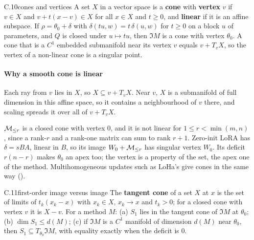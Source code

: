 
\begin{bgentry}{C.10}{cones and vertices}
A set $X$ in a vector space is a \textbf{cone} with \textbf{vertex} $v$ if $v\in X$ and $v+t(x-v)\in X$ for all $x\in X$
and $t\ge0$, and \textbf{linear} if it is an affine subspace. If $\rho=\theta_0+\delta$ with
$\delta(tu,w)=t\,\delta(u,w)$ for $t\ge0$ on a block $u$ of parameters, and $Q$ is closed under $u\mapsto tu$, then $\Im
M$ is a cone with vertex $\theta_0$. A cone that is a $C^1$ embedded submanifold near its vertex $v$ equals $v+T_vX$, so
the vertex of a non-linear cone is a singular point.
\end{bgentry}

\paragraph{Why a smooth cone is linear}
Each ray from $v$ lies in $X$, so $X\subseteq v+T_vX$. Near $v$, $X$ is a submanifold of full dimension in this affine
space, so it contains a neighbourhood of $v$ there, and scaling spreads it over all of $v+T_vX$.

$\mathcal{M}_{\le r}$ is a closed cone with vertex $0$, and it is not linear for $1\le r<\min(m,n)$, since a rank-$r$ and a rank-one
matrix can sum to rank $r+1$. Zero-init LoRA has $\delta=sBA$, linear in $B$, so its image $W_0+\mathcal{M}_{\le r}$ has singular vertex
$W_0$. Its deficit $r(n-r)$ makes $\theta_0$ an apex too; the vertex is a property of the set, the apex one of the
method. Multihomogeneous updates such as LoHa's \citep{hyeonwoo2021fedpara} give cones in the same way ().


\begin{bgfact}{C.11}{first-order image versus image}
The \textbf{tangent cone} of a set $X$ at $x$ is the set of limits of $t_k(x_k-x)$ with $x_k\in X$, $x_k\to x$ and
$t_k>0$; for a closed cone with vertex $v$ it is $X-v$. For a method $M$: (a) $S_1$ lies in the tangent cone of $\Im M$
at $\theta_0$; (b) $\dim S_1\le d(M)$; (c) if $\Im M$ is a $C^1$ manifold of dimension $d(M)$ near $\theta_0$, then
$S_1\subseteq T_{\theta_0}\Im M$, with equality exactly when the deficit is $0$.
\end{bgfact}

